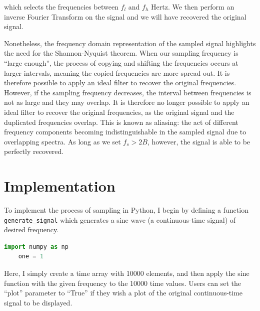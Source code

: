 \documentclass{article}
\begin{document}
which selects the frequencies between $f_l$ and $f_h$ Hertz. %
We then perform an inverse Fourier Transform on the signal and we will have recovered the original signal. %

Nonetheless, the frequency domain representation of the sampled signal highlights the need for the Shannon-Nyquist theorem. %
When our sampling frequency is ``large enough'', the process of copying and shifting the frequencies occurs at larger intervals, meaning the copied frequencies are more spread out. It is therefore possible to apply an ideal filter to recover the original frequencies. %
However, if the sampling frequency decreases, the interval between frequencies is not as large and they may overlap. It is therefore no longer possible to apply an ideal filter to recover the original frequencies, as the original signal and the duplicated frequencies overlap.
This is known as aliasing: the act of different frequency components becoming indistinguishable in the sampled signal due to overlapping spectra. %
As long as we set $f_s > 2B$, however, the signal is able to be perfectly recovered. 



\section{Implementation}
To implement the process of sampling in Python, I begin by defining a function \verb|generate_signal| which generates a sine wave (a continuous-time signal) of desired frequency.
\begin{lstlisting}[language = Python]
    import numpy as np
    one = 1
\end{lstlisting}
Here, I simply create a time array with 10000 elements, and then apply the sine function with the given frequency to the 10000 time values. 
Users can set the ``plot'' parameter to ``True'' if they wish a plot of the original continuous-time signal to be displayed.
\end{document}

